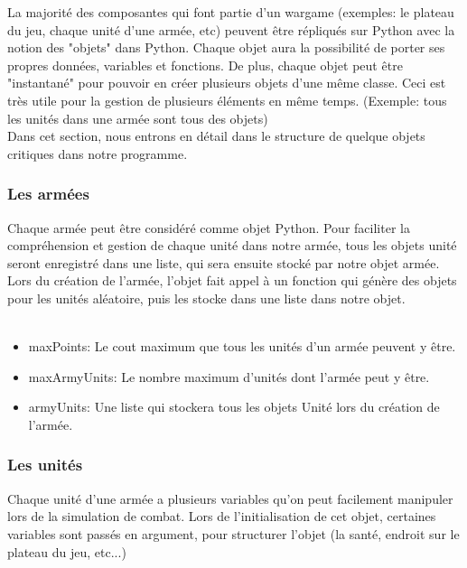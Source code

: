 \documentclass[a4paper, 11pt]{article}
\begin{document}
La majorité des composantes qui font partie d'un wargame (exemples: le plateau du jeu, chaque unité d'une armée, etc) peuvent être répliqués sur Python avec la notion des "objets" dans Python. Chaque objet aura la possibilité de porter ses propres données, variables et fonctions. De plus, chaque objet peut être "instantané" pour pouvoir en créer plusieurs objets d'une même classe. Ceci est très utile pour la gestion de plusieurs éléments en même temps. (Exemple: tous les unités dans une armée sont tous des objets) \\

Dans cet section, nous entrons en détail dans le structure de quelque objets critiques dans notre programme.

\subsubsection{Les armées}

Chaque armée peut être considéré comme objet Python. Pour faciliter la compréhension et gestion de chaque unité dans notre armée, tous les objets unité seront enregistré dans une liste, qui sera ensuite stocké par notre objet armée. Lors du création de l'armée, l'objet fait appel à un fonction qui génère des objets pour les unités aléatoire, puis les stocke dans une liste dans notre objet.  \\ \\


\begin{itemize}

\item{maxPoints: Le cout maximum que tous les unités d'un armée peuvent y être.}
\item{maxArmyUnits: Le nombre maximum d'unités dont l'armée peut y être.}
\item{armyUnits: Une liste qui stockera tous les objets Unité lors du création de l'armée.}

\end{itemize}

\subsubsection{Les unités}

Chaque unité d'une armée a plusieurs variables qu'on peut facilement manipuler lors de la simulation de combat. Lors de l'initialisation de cet objet, certaines  variables sont passés en argument, pour structurer l’objet (la santé, endroit sur le plateau du jeu, etc...) \\ \\
\end{document}
